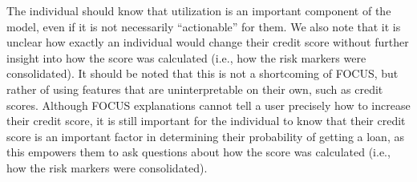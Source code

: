 The individual should know that utilization is an important component of the model, even if it is not necessarily ``actionable'' for them. 
We also note that it is unclear how exactly an individual would change their credit score without further insight into how the score was calculated (i.e., how the risk markers were consolidated).
It should be noted that this is not a shortcoming of FOCUS, but rather of using features that are uninterpretable on their own, such as credit scores.
Although FOCUS explanations cannot tell a user precisely how to increase their credit score, it is still important for the individual to know that their credit score is an important factor in determining their probability of getting a loan, as this empowers them to ask questions about how the score was calculated (i.e., how the risk markers were consolidated).


